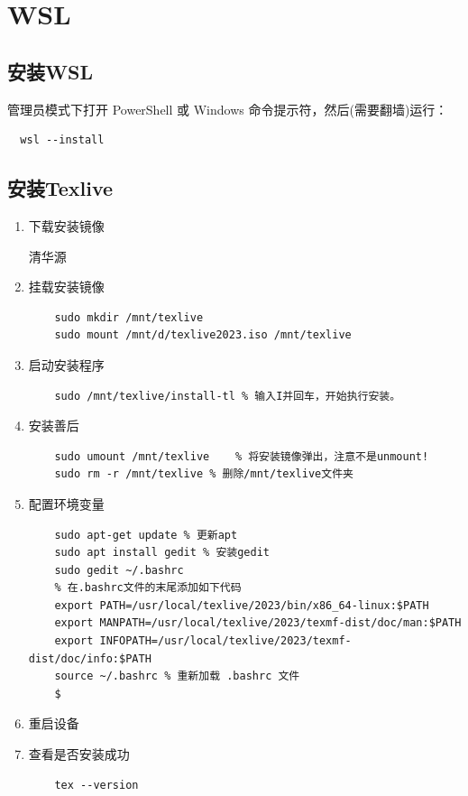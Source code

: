\section{WSL}

\subsection{安装WSL}

管理员模式下打开 PowerShell 或 Windows 命令提示符，然后(需要翻墙)运行：

\begin{lstlisting}
  wsl --install
\end{lstlisting}

\subsection{安装Texlive}

\begin{enumerate}
  \item 下载安装镜像
  
  清华源 
  \item 挂载安装镜像
  
  \begin{lstlisting}
    sudo mkdir /mnt/texlive
    sudo mount /mnt/d/texlive2023.iso /mnt/texlive    
  \end{lstlisting}
  \item 启动安装程序
  
  \begin{lstlisting}
    sudo /mnt/texlive/install-tl % 输入I并回车，开始执行安装。
  \end{lstlisting}
  \item 安装善后
  
  \begin{lstlisting}
    sudo umount /mnt/texlive	% 将安装镜像弹出，注意不是unmount! 
    sudo rm -r /mnt/texlive % 删除/mnt/texlive文件夹
  \end{lstlisting}
  \item 配置环境变量
  
  \begin{lstlisting}
    sudo apt-get update % 更新apt
    sudo apt install gedit % 安装gedit
    sudo gedit ~/.bashrc
    % 在.bashrc文件的末尾添加如下代码
    export PATH=/usr/local/texlive/2023/bin/x86_64-linux:$PATH
    export MANPATH=/usr/local/texlive/2023/texmf-dist/doc/man:$PATH
    export INFOPATH=/usr/local/texlive/2023/texmf-dist/doc/info:$PATH
    source ~/.bashrc % 重新加载 .bashrc 文件
    $
  \end{lstlisting}
  \item 重启设备
  \item 查看是否安装成功
  
  \begin{lstlisting}
    tex --version
  \end{lstlisting}
\end{enumerate}

